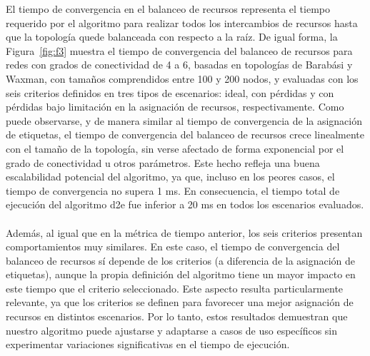 El tiempo de convergencia en el balanceo de recursos representa el tiempo requerido por el algoritmo para realizar todos los intercambios de recursos hasta que la topología quede balanceada con respecto a la raíz. De igual forma, la Figura~\ref{fig:f3} muestra el tiempo de convergencia del balanceo de recursos para redes con grados de conectividad de 4 a 6, basadas en topologías de Barabási y Waxman, con tamaños comprendidos entre 100 y 200 nodos, y evaluadas con los seis criterios definidos en tres tipos de escenarios: ideal, con pérdidas y con pérdidas bajo limitación en la asignación de recursos, respectivamente. Como puede observarse, y de manera similar al tiempo de convergencia de la asignación de etiquetas, el tiempo de convergencia del balanceo de recursos crece linealmente con el tamaño de la topología, sin verse afectado de forma exponencial por el grado de conectividad u otros parámetros. Este hecho refleja una buena escalabilidad potencial del algoritmo, ya que, incluso en los peores casos, el tiempo de convergencia no supera 1 ms. En consecuencia, el tiempo total de ejecución del algoritmo \gls{d2e} fue inferior a 20 ms en todos los escenarios evaluados.\\
\\
Además, al igual que en la métrica de tiempo anterior, los seis criterios presentan comportamientos muy similares. En este caso, el tiempo de convergencia del balanceo de recursos sí depende de los criterios (a diferencia de la asignación de etiquetas), aunque la propia definición del algoritmo tiene un mayor impacto en este tiempo que el criterio seleccionado. Este aspecto resulta particularmente relevante, ya que los criterios se definen para favorecer una mejor asignación de recursos en distintos escenarios. Por lo tanto, estos resultados demuestran que nuestro algoritmo puede ajustarse y adaptarse a casos de uso específicos sin experimentar variaciones significativas en el tiempo de ejecución. 


